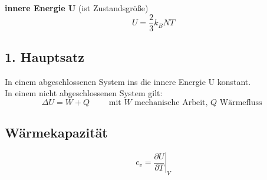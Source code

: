 \textbf{innere Energie U} (ist Zustandsgröße)\\
\[U=\frac{2}{3}k_BNT\]

\subsection{1. Hauptsatz}
 In einem abgeschlossenen System ins die innere Energie U konstant.\\
In einem nicht abgeschlossenen System gilt:
\[\Delta U = W + Q \qquad \text{ mit } W \text{ mechanische Arbeit, }Q\text{ Wärmefluss }\]

\subsection{Wärmekapazität }

\[c_v=\left.\frac{\partial U}{\partial T}\right|_V\]